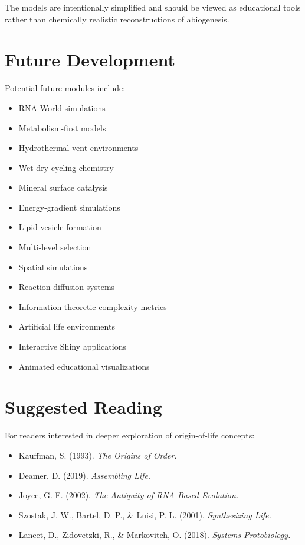 \documentclass[
  oneside,
  openany]{book}
\providecommand{\tightlist}{%
  \setlength{\itemsep}{0pt}\setlength{\parskip}{0pt}}
\begin{document}
The models are intentionally simplified and should be viewed as educational tools rather than chemically realistic reconstructions of abiogenesis.

\section{Future Development}\label{future-development}

Potential future modules include:

\begin{itemize}
\tightlist
\item
  RNA World simulations
\item
  Metabolism-first models
\item
  Hydrothermal vent environments
\item
  Wet-dry cycling chemistry
\item
  Mineral surface catalysis
\item
  Energy-gradient simulations
\item
  Lipid vesicle formation
\item
  Multi-level selection
\item
  Spatial simulations
\item
  Reaction-diffusion systems
\item
  Information-theoretic complexity metrics
\item
  Artificial life environments
\item
  Interactive Shiny applications
\item
  Animated educational visualizations
\end{itemize}

\section{Suggested Reading}\label{suggested-reading}

For readers interested in deeper exploration of origin-of-life concepts:

\begin{itemize}
\tightlist
\item
  Kauffman, S. (1993). \emph{The Origins of Order.}
\item
  Deamer, D. (2019). \emph{Assembling Life.}
\item
  Joyce, G. F. (2002). \emph{The Antiquity of RNA-Based Evolution.}
\item
  Szostak, J. W., Bartel, D. P., \& Luisi, P. L. (2001). \emph{Synthesizing Life.}
\item
  Lancet, D., Zidovetzki, R., \& Markovitch, O. (2018). \emph{Systems Protobiology.}
\end{itemize}
\end{document}
